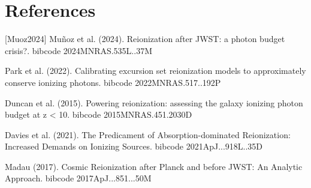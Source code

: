 \documentclass[twocolumn]{aastex631}
\begin{document}
\section*{References}
\footnotesize
[Muoz2024] Muñoz et al. (2024). Reionization after JWST: a photon budget crisis?. bibcode 2024MNRAS.535L..37M \par [Park2022] Park et al. (2022). Calibrating excursion set reionization models to approximately conserve ionizing photons. bibcode 2022MNRAS.517..192P \par [Duncan2015] Duncan et al. (2015). Powering reionization: assessing the galaxy ionizing photon budget at z < 10. bibcode 2015MNRAS.451.2030D \par [Davies2021] Davies et al. (2021). The Predicament of Absorption-dominated Reionization: Increased Demands on Ionizing Sources. bibcode 2021ApJ...918L..35D \par [Madau2017] Madau (2017). Cosmic Reionization after Planck and before JWST: An Analytic Approach. bibcode 2017ApJ...851...50M
\end{document}
